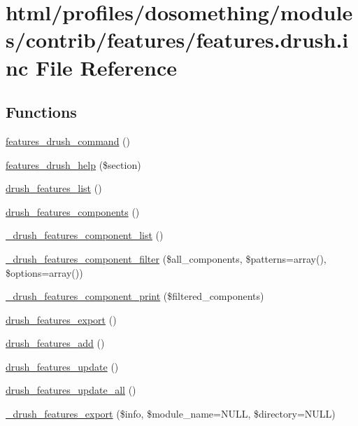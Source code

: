 \hypertarget{features_8drush_8inc}{
\section{html/profiles/dosomething/modules/contrib/features/features.drush.inc File Reference}
\label{features_8drush_8inc}
}
\subsection*{Functions}
\begin{DoxyCompactItemize}
\item 
\hyperlink{features_8drush_8inc_a00ed49df191e919ece900cc7aa8b8921}{features\_\-drush\_\-command} ()
\item 
\hyperlink{features_8drush_8inc_af50837dd8f14194568dffcfad0c38f9c}{features\_\-drush\_\-help} (\$section)
\item 
\hyperlink{features_8drush_8inc_a65af07a0ebc9889a8bc4ae56b860d756}{drush\_\-features\_\-list} ()
\item 
\hyperlink{features_8drush_8inc_a8018fdcee7b58fd3a05ca4a7688db1f4}{drush\_\-features\_\-components} ()
\item 
\hyperlink{features_8drush_8inc_a8c810b2c994b99f9307a4cedbbbd7f0c}{\_\-drush\_\-features\_\-component\_\-list} ()
\item 
\hyperlink{features_8drush_8inc_a01f48749fead1e5c6982f6c554d49454}{\_\-drush\_\-features\_\-component\_\-filter} (\$all\_\-components, \$patterns=array(), \$options=array())
\item 
\hyperlink{features_8drush_8inc_a4721c725c6eeaf6030a1e073835fe8ad}{\_\-drush\_\-features\_\-component\_\-print} (\$filtered\_\-components)
\item 
\hyperlink{features_8drush_8inc_a0eae3a9ca889fd7820b3556c5167d0dd}{drush\_\-features\_\-export} ()
\item 
\hyperlink{features_8drush_8inc_a4c44d06332931a2474f148f6d1469436}{drush\_\-features\_\-add} ()
\item 
\hyperlink{features_8drush_8inc_ae2dbdf181a8cca17c4ef45646ceb0ea1}{drush\_\-features\_\-update} ()
\item 
\hyperlink{features_8drush_8inc_a7d95941d91e834c1e3cee0ffa754ceec}{drush\_\-features\_\-update\_\-all} ()
\item 
\hyperlink{features_8drush_8inc_a3773d63fc524e8440924d9f79cc1231a}{\_\-drush\_\-features\_\-export} (\$info, \$module\_\-name=NULL, \$directory=NULL)

\end{DoxyCompactItemize}
